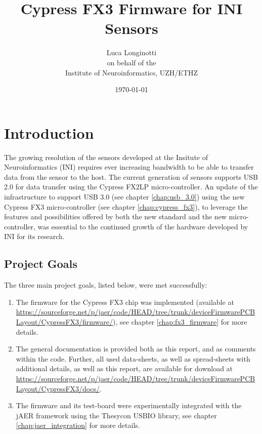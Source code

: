\documentclass[a4paper,12pt]{report}
\begin{document}
\title{Cypress FX3 Firmware for INI Sensors}

\author{Luca Longinotti\\on behalf of the\\Institute of Neuroinformatics, UZH/ETHZ}

\date{\today}

\maketitle

\tableofcontents{}
\clearpage

\chapter{Introduction} \label{chap:introduction}

The growing resolution of the sensors developed at the Insitute of Neuroinformatics (INI) requires ever increasing bandwidth to be able to transfer data from the sensor to the host. The current generation of sensors supports USB 2.0 for data transfer using the Cypress FX2LP micro-controller. An update of the infrastructure to support USB 3.0 (see chapter \ref{chap:usb_3.0}) using the new Cypress FX3 micro-controller (see chapter \ref{chap:cypress_fx3}), to leverage the features and possibilities offered by both the new standard and the new micro-controller, was essential to the continued growth of the hardware developed by INI for its research.

\section{Project Goals} \label{sec:project_goals}

The three main project goals, listed below, were met successfully:

\begin{enumerate}
\item The firmware for the Cypress FX3 chip was implemented (available at \url{https://sourceforge.net/p/jaer/code/HEAD/tree/trunk/deviceFirmwarePCBLayout/CypressFX3/firmware/}), see chapter \ref{chap:fx3_firmware} for more details.
\item The general documentation is provided both as this report, and as comments within the code. Further, all used data-sheets, as well as spread-sheets with additional details, as well as this report, are available for download at \url{https://sourceforge.net/p/jaer/code/HEAD/tree/trunk/deviceFirmwarePCBLayout/CypressFX3/docs/}.
\item The firmware and its test-board were experimentally integrated with the jAER framework using the Thesycon USBIO library, see chapter \ref{chap:jaer_integration} for more details.
\end{enumerate}
\end{document}
